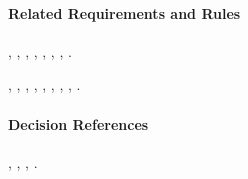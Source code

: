 \paragraph{Related Requirements and Rules}
\hyperref[fr:038]{}, \hyperref[fr:040]{}, \hyperref[fr:041]{}, \hyperref[fr:042]{}, \hyperref[fr:043]{}, \hyperref[fr:044]{}, \hyperref[fr:045]{}, \hyperref[fr:063]{}.

\hyperref[br:022]{}, \hyperref[br:023]{}, \hyperref[br:024]{}, \hyperref[br:026]{}, \hyperref[br:027]{}, \hyperref[br:028]{}, \hyperref[br:030]{}, \hyperref[br:041]{}, \hyperref[br:044]{}.

\paragraph{Decision References}
, , , .
